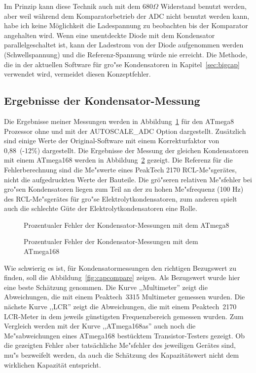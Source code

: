 Im Prinzip kann diese Technik auch mit dem \(680\Omega\) Widerstand benutzt werden,
aber weil w\"ahrend dem Komparatorbetrieb der ADC nicht benutzt werden kann, habe ich keine
M\"oglichkeit die Ladespannung zu beobachten bis der Komparator angehalten wird.
Wenn eine unentdeckte Diode mit dem Kondensator parallelgeschaltet ist, kann der Ladestrom
von der Diode aufgenommen werden (Schwellspannung) und die Referenz-Spannung w\"urde nie erreicht.
Die Methode, die in der aktuellen Software f\"ur gro"se Kondensatoren in Kapitel~\ref{sec:bigcap}
verwendet wird, vermeidet diesen Konzeptfehler.

\subsection{Ergebnisse der Kondensator-Messung}
Die Ergebnisse meiner Messungen werden in Abbildung~\ref{fig:mega8cap} f\"ur den ATmega8 Prozessor ohne und mit
der AUTOSCALE\_ADC Option dargestellt. Zus\"atzlich sind einige Werte der Original-Software mit einem Korrekturfaktor
von 0,88~(-12\%) dargestellt.
Die Ergebnisse der Messung der gleichen Kondensatoren mit einem ATmega168 werden in Abbildung~\ref{fig:mega168cap} gezeigt.
Die Referenz f\"ur die Fehlerberechnung sind die Me"swerte eines PeakTech 2170 RCL-Me"sger\"ates, 
 nicht die aufgedruckten Werte der Bauteile.
Die gr\"o"seren relativen Me"sfehler bei gro"sen Kondensatoren liegen zum Teil an der zu hohen Me"sfrequenz (100 Hz) des
RCL-Me"sger\"ates f\"ur gro"se Elektrolytkondensatoren, zum anderen spielt auch die schlechte G\"ute der
Elektrolytkondensatoren eine Rolle.

\begin{figure}[H]
\centering

\caption{Prozentualer Fehler der Kondensator-Messungen mit dem ATmega8}
\label{fig:mega8cap}
\end{figure}

\begin{figure}[H]
\centering

\caption{Prozentualer Fehler der Kondensator-Messungen mit dem ATmega168}
\label{fig:mega168cap}
\end{figure}

Wie schwierig es ist, f\"ur Kondensatormessungen den richtigen Bezugswert zu finden, soll die Abbildung~\ref{fig:capcompare} zeigen.
Als Bezugswert wurde hier eine beste Sch\"atzung genommen. Die Kurve ,,Multimeter'' zeigt die Abweichungen, die mit einem
Peaktech~3315 Multimeter gemessen wurden.
Die n\"achste Kurve ,,LCR'' zeigt die Abweichungen, die mit einem Peaktech~2170 LCR-Meter in dem jeweils g\"unstigsten Frequenzbereich gemessen wurden.
Zum Vergleich werden mit der Kurve ,,ATmega168as'' auch noch die Me"sabweichungen eines ATmega168 best\"ucktem Transistor-Testers gezeigt.
Ob die gezeigten Fehler aber tats\"achliche Me"sfehler des jeweiligen Ger\"ates sind, mu"s bezweifelt werden, da auch die
Sch\"atzung des Kapazit\"atswert nicht dem wirklichen Kapazit\"at entspricht.

